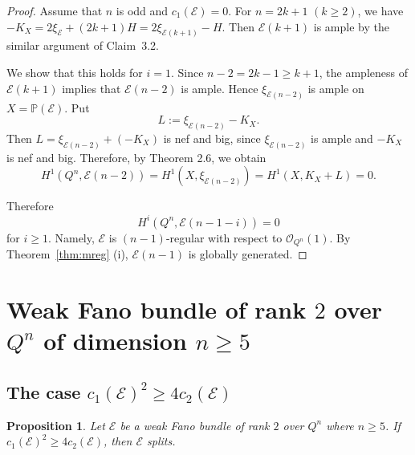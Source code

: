 \documentclass{amsproc}
\newtheorem{proposition}[theorem]{Proposition}
\theoremstyle{definition}
\def\cE{{\mathcal E}}
\def\cO{{\mathcal{O}}}
\def\tensor{\otimes}
\begin{document}
\begin{proof}
Assume that $n$ is odd and $c_1(\cE)=0$. For $n=2k+1$ $(k\ge2)$, we have $-K_X=2\xi_{\cE}+(2k+1)H=2\xi_{\cE(k+1)}-H$. Then $\cE(k+1)$ is ample by  the similar  argument of Claim~3.2. 
 
We show that this holds for \(i=1\). Since \(n-2=2k-1\geq k+1\),
the ampleness of \(\mathcal{E}(k+1)\) implies that
\(\mathcal{E}(n-2)\) is ample. Hence \(\xi_{\mathcal{E}(n-2)}\) is ample on
\(X=\mathbb{P}(\mathcal{E})\). Put
\[
L:=\xi_{\mathcal{E}(n-2)}-K_X.
\]
Then \(L=\xi_{\mathcal{E}(n-2)}+(-K_X)\) is nef and big, since
\(\xi_{\mathcal{E}(n-2)}\) is ample and \(-K_X\) is nef and big.
Therefore, by Theorem 2.6, we obtain
\[
H^1(Q^n,\mathcal{E}(n-2))
=
H^1(X,\xi_{\mathcal{E}(n-2)})
=
H^1(X,K_X+L)
=0.
\]

Therefore 
$$
H^i(Q^n, \cE(n-1-i))=0
$$
for $i\ge 1$. Namely, $\cE$ is $(n-1)$-regular with respect to $\cO_{Q^n}(1)$. By Theorem~\ref{thm:mreg} (i), $\cE(n-1)$ is globally generated. 
\end{proof}

\section{Weak Fano bundle of rank $2$ over $Q^n$ of dimension $n\ge 5$}

\subsection{The case $c_1(\cE)^2\ge 4c_2(\cE)$}
\begin{proposition}\label{prop:unsta-sp}
Let $\cE$ be a weak Fano bundle of rank $2$ over $Q^n$ where $n\ge 5$.  If $c_1(\cE)^2\ge 4c_2(\cE)$, then $\cE$ splits.
\end{proposition}
\end{document}
